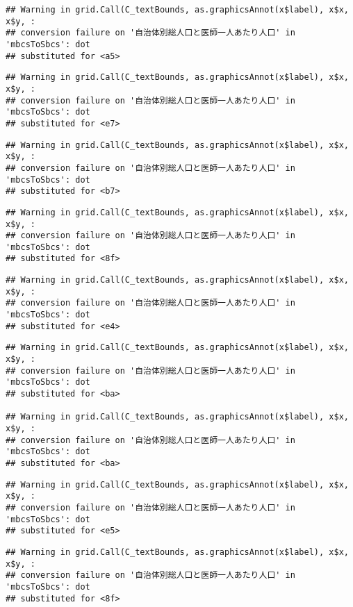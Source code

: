\documentclass[
]{article}
\begin{document}
\begin{verbatim}
## Warning in grid.Call(C_textBounds, as.graphicsAnnot(x$label), x$x, x$y, :
## conversion failure on '自治体別総人口と医師一人あたり人口' in 'mbcsToSbcs': dot
## substituted for <a5>
\end{verbatim}

\begin{verbatim}
## Warning in grid.Call(C_textBounds, as.graphicsAnnot(x$label), x$x, x$y, :
## conversion failure on '自治体別総人口と医師一人あたり人口' in 'mbcsToSbcs': dot
## substituted for <e7>
\end{verbatim}

\begin{verbatim}
## Warning in grid.Call(C_textBounds, as.graphicsAnnot(x$label), x$x, x$y, :
## conversion failure on '自治体別総人口と医師一人あたり人口' in 'mbcsToSbcs': dot
## substituted for <b7>
\end{verbatim}

\begin{verbatim}
## Warning in grid.Call(C_textBounds, as.graphicsAnnot(x$label), x$x, x$y, :
## conversion failure on '自治体別総人口と医師一人あたり人口' in 'mbcsToSbcs': dot
## substituted for <8f>
\end{verbatim}

\begin{verbatim}
## Warning in grid.Call(C_textBounds, as.graphicsAnnot(x$label), x$x, x$y, :
## conversion failure on '自治体別総人口と医師一人あたり人口' in 'mbcsToSbcs': dot
## substituted for <e4>
\end{verbatim}

\begin{verbatim}
## Warning in grid.Call(C_textBounds, as.graphicsAnnot(x$label), x$x, x$y, :
## conversion failure on '自治体別総人口と医師一人あたり人口' in 'mbcsToSbcs': dot
## substituted for <ba>

## Warning in grid.Call(C_textBounds, as.graphicsAnnot(x$label), x$x, x$y, :
## conversion failure on '自治体別総人口と医師一人あたり人口' in 'mbcsToSbcs': dot
## substituted for <ba>
\end{verbatim}

\begin{verbatim}
## Warning in grid.Call(C_textBounds, as.graphicsAnnot(x$label), x$x, x$y, :
## conversion failure on '自治体別総人口と医師一人あたり人口' in 'mbcsToSbcs': dot
## substituted for <e5>
\end{verbatim}

\begin{verbatim}
## Warning in grid.Call(C_textBounds, as.graphicsAnnot(x$label), x$x, x$y, :
## conversion failure on '自治体別総人口と医師一人あたり人口' in 'mbcsToSbcs': dot
## substituted for <8f>
\end{verbatim}
\end{document}
